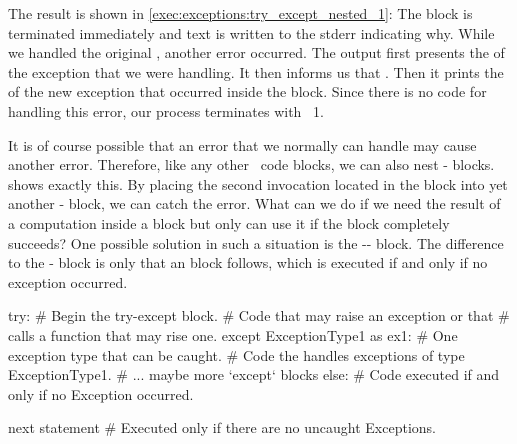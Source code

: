 The result is shown in \cref{exec:exceptions:try_except_nested_1}:
The  block is terminated immediately and text is written to the \gls{stderr} indicating why.
While we handled the original , another error occurred.
The output first presents the  of the exception that we were handling.
It then informs us that .
Then it prints the  of the new exception that occurred inside the  block.
Since there is no code for handling this error, our process terminates with ~1.

%
%
It is of course possible that an error that we normally can handle may cause another error.
Therefore, like any other \python\ code blocks, we can also nest - blocks.
 shows exactly this.
By placing the second  invocation located in the  block into yet another - block, we can catch the  error.%
%
\FloatBarrier%
\endhsection%
%
%
%
What can we do if we need the result of a computation inside a  block but only can use it if the  block completely succeeds?
One possible solution in such a situation is the -- block.
The difference to the - block is only that an  block follows, which is executed if and only if no exception occurred.%
%
\begin{pythonSyntax}
try:  # Begin the try-except block.
    # Code that may raise an exception or that
    # calls a function that may rise one.
except ExceptionType1 as ex1:  # One exception type that can be caught.
    # Code the handles exceptions of type ExceptionType1.
# ... maybe more `except` blocks
else:
    # Code executed if and only if no Exception occurred.

next statement  # Executed only if there are no uncaught Exceptions.
\end{pythonSyntax}
%
%
